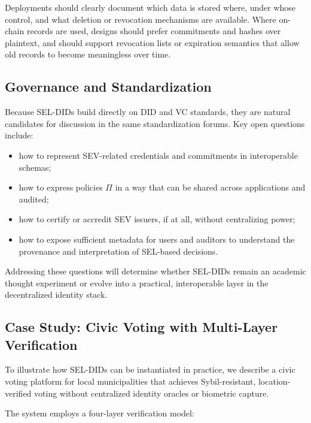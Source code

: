 \documentclass[11pt]{article}
\begin{document}
Deployments should clearly document which data is stored where, under whose control, and what deletion or revocation mechanisms are available. Where on-chain records are used, designs should prefer commitments and hashes over plaintext, and should support revocation lists or expiration semantics that allow old records to become meaningless over time.

\subsection{Governance and Standardization}

Because SEL-DIDs build directly on DID and VC standards, they are natural candidates for discussion in the same standardization forums. Key open questions include:

\begin{itemize}
  \item how to represent SEV-related credentials and commitments in interoperable schemas;
  \item how to express policies $\Pi$ in a way that can be shared across applications and audited;
  \item how to certify or accredit SEV issuers, if at all, without centralizing power;
  \item how to expose sufficient metadata for users and auditors to understand the provenance and interpretation of SEL-based decisions.
\end{itemize}

Addressing these questions will determine whether SEL-DIDs remain an academic thought experiment or evolve into a practical, interoperable layer in the decentralized identity stack.

\subsection{Case Study: Civic Voting with Multi-Layer Verification}
\label{sec:case_study}

To illustrate how SEL-DIDs can be instantiated in practice, we describe a civic voting platform for local municipalities that achieves Sybil-resistant, location-verified voting without centralized identity oracles or biometric capture.

The system employs a four-layer verification model:
\end{document}

